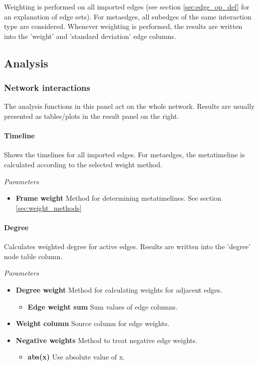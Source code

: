 Weighting is performed on all imported edges (see section \ref{sec:edge_op_def} for an explanation of edge sets). For metaedges, all subedges of the same interaction type are considered. Whenever weighting is performed, the results are written into the 'weight' and 'standard deviation' edge columns.

\subsection{Analysis}

\subsubsection{Network interactions}
\label{sec:network_interactions}
The analysis functions in this panel act on the whole network. Results are usually presented as tables/plots in the result panel on the right.

\paragraph{Timeline}

Shows the timelines for all imported edges. For metaedges, the metatimeline is calculated according to the selected weight method.

\textit{Parameters}
\begin{itemize}
\item \textbf{Frame weight} Method for determining metatimelines. See section \ref{sec:weight_methods}
\end{itemize}


\paragraph{Degree}

Calculates weighted degree for active edges. Results are written into the 'degree' node table column.

\textit{Parameters}
\begin{itemize}
\item \textbf{Degree weight} Method for calculating weights for adjacent edges.
  \begin{itemize}
  \item \textbf{Edge weight sum} Sum values of edge columns.
  \end{itemize}
\item \textbf{Weight column} Source column for edge weights.
\item \textbf{Negative weights} Method to treat negative edge weights.
  \begin{itemize}
  \item \textbf{abs(x)} Use absolute value of x.
  \end{itemize}
\end{itemize}


